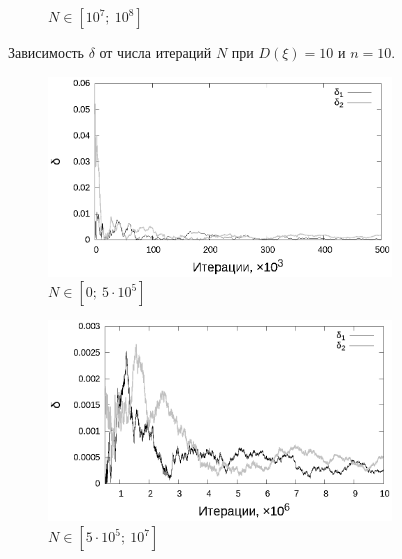 \documentclass[11pt,a4paper]{article}
\theoremstyle{definition}
\begin{document}
\begin{figure}[h!]
\begin{subfigure}[b]{0.3\textwidth}
    \caption{$N \in [10^7;~10^8]$}
    \label{fig:classic_var10_n10_end}
  \end{subfigure}
  \caption{Зависимость $\delta$ от числа итераций $N$ при $D(\xi) = 10$ и $n = 10$.}
  \label{fig:classic_var10_n10}
\end{figure}

\begin{figure}[h!]
  \begin{subfigure}[b]{0.3\textwidth}
    \includegraphics[width=\textwidth]{figs/classic/linear_log_1x_2_samples_10_variance_1_norm.log_0_500.eps}
    \caption{$N \in [0;~5 \cdot 10^5]$}
    \label{fig:classic_var1_n10_begin}
  \end{subfigure}
  \begin{subfigure}[b]{0.3\textwidth}
    \includegraphics[width=\textwidth]{figs/classic/linear_log_1x_2_samples_10_variance_1_norm.log_500_10000.eps}
    \caption{$N \in [5 \cdot 10^5;~10^7]$}
    \label{fig:classic_var1_n10_middle}
  \end{subfigure}
  \begin{subfigure}[b]{0.3\textwidth}

\end{subfigure}
\end{figure}
\end{document}

